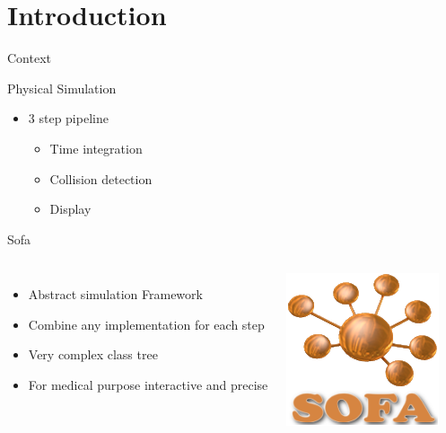 \documentclass[xcolor={usenames,dvipsnames},draft]{beamer}
\newcommand{\sectiontitle}{}
\newcommand{\newsection}[1]{\renewcommand{\sectiontitle}{#1}\section{#1}}
\begin{document}
\newsection{Introduction}
\begin{frame}{Context}
    \begin{block}{Physical Simulation}
        \begin{itemize}
            \item 3 step pipeline 
                \begin{itemize}
                    \item Time integration
                    \item Collision detection
                    \item Display
                \end{itemize}
        \end{itemize}
    \end{block}
    \pause
    \begin{alertblock}{Sofa \cite{Allard07SOFA,Faure11Sparse,Nesme09Preserving}}
        \begin{columns}
            \begin{itemize}[<+->]
                \item \alert{Abstract} simulation Framework
                \item Combine any implementation for each step
                \item Very complex class tree
                \item For medical purpose \alert{interactive and precise}
            \end{itemize}
            {
                \includegraphics[width=\textwidth]{sofa.png}
            }
        \end{columns}
    \end{alertblock}
\end{frame}
\end{document}
